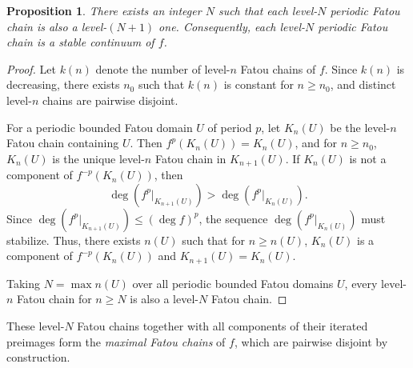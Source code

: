 \documentclass[a4paper,reqno,times, 11pt]{amsart}
\newtheorem{proposition}[theorem]{Proposition}
\theoremstyle{remark}
\theoremstyle{plain}
\numberwithin{equation}{section}
\begin{document}
	\begin{proposition}\label{pro:max}
		There exists an integer $N$ such that each level-$N$ periodic Fatou chain is also a level-$(N+1)$ one. Consequently, each level-$N$ periodic Fatou chain is a stable continuum of $f$.
	\end{proposition}
	\begin{proof}
		Let $k(n)$ denote the number of level-$n$ Fatou chains of $f$. Since $k(n)$ is decreasing, there exists $n_0$ such that $k(n)$ is constant for $n \geq n_0$, and distinct level-$n$ chains are pairwise disjoint.
		
		For a periodic bounded Fatou domain $U$ of period $p$, let $K_n(U)$ be the level-$n$ Fatou chain containing $U$. Then $f^p(K_n(U)) = K_n(U)$, and for $n \ge n_0$, $K_n(U)$ is the unique level-$n$ Fatou chain in $K_{n+1}(U)$. If $K_n(U)$ is not a component of $f^{-p}(K_n(U))$, then
		\[
		\deg(f^p|_{K_{n+1}(U)}) > \deg(f^p|_{K_n(U)}).
		\]
		Since $\deg(f^p|_{K_{n+1}(U)}) \leq (\deg f)^p$, the sequence $\deg(f^p|_{K_n(U)})$ must stabilize. Thus, there exists $n(U)$ such that for $n \ge n(U)$, $K_n(U)$ is a component of $f^{-p}(K_n(U))$ and $K_{n+1}(U) = K_n(U)$.
		
		Taking $N = \max n(U)$ over all periodic bounded Fatou domains $U$, every level-$n$ Fatou chain for $n \geq N$ is also a level-$N$ Fatou chain.
	\end{proof}
	These level-$N$ Fatou chains together with all components of their iterated preimages form the \emph{maximal Fatou chains} of $f$, which are pairwise disjoint by construction.
	
\end{document}
